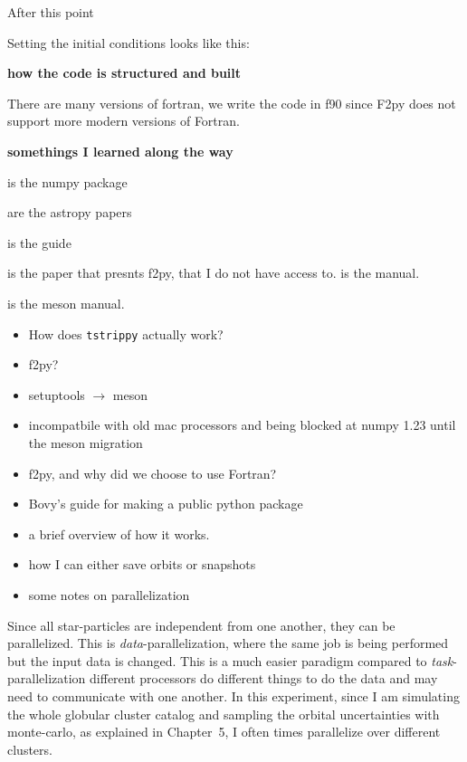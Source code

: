         After this point

        Setting the initial conditions looks like this: 

    \textbf{how the code is structured and built}

    There are many versions of fortran, we write the code in f90 since F2py does not support more modern versions of Fortran.

    \textbf{somethings I learned along the way}

    \citet{2020Natur.585..357H} is the numpy package
    
    \citet{2013A&A...558A..33A} \citet{2018AJ....156..123A} are the astropy papers
    
    \citet{pythonpackagingguide} is the guide 

    \citet{peterson2009f2py} is the paper that presnts f2py, that I do not have access to. 
    \citet{numpy_f2py_manual} is the manual. 

    \citet{meson_manual} is the meson manual. 

    \begin{itemize}
        \item How does \texttt{tstrippy} actually work?
        \item f2py? 
        \item setuptools $\rightarrow$ meson 
        \item incompatbile with old mac processors and being blocked at numpy 1.23 until the meson migration 
        \item f2py, and why did we choose to use Fortran? 
        \item Bovy's guide for making a public python package
        \item a brief overview of how it works. 
        \item how I can either save orbits or snapshots
        \item some notes on parallelization
    \end{itemize}

    Since all star-particles are independent from one another, they can be parallelized. This is \textit{data}-parallelization, where the same job is being performed but the input data is changed. This is a much easier paradigm compared to \textit{task}-parallelization different processors do different things to do the data and may need to communicate with one another. In this experiment, since I am simulating the whole globular cluster catalog and sampling the orbital uncertainties with monte-carlo, as explained in Chapter~5, I often times parallelize over different clusters. 
            
